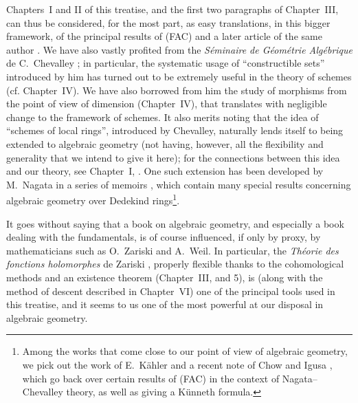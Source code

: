 Chapters~I and II of this treatise, and the first two paragraphs of Chapter~III,
can thus be considered, for the most part, as easy translations, in this bigger
framework, of the principal results of (FAC) and a later article of the same
author \cite{I-15}. We have also vastly profited from the {\it S\'eminaire de
G\'eom\'etrie Alg\'ebrique} de C.~Chevalley \cite{I-1}; in particular, the
systematic usage of ``constructible sets'' introduced by him has turned out to
be extremely useful in the theory of schemes (cf. Chapter~IV). We have also
borrowed from him the study of morphisms from
the point of view of dimension (Chapter~IV), that translates with negligible
change to the framework of schemes. It also merits noting that the idea of
``schemes of local rings'', introduced by Chevalley, naturally lends itself to
being extended to algebraic geometry (not having, however, all the flexibility
and generality that we intend to give it here); for the connections between this
idea and our theory, see Chapter~I, . One such extension has been
developed by M.~Nagata in a series of memoirs \cite{I-9}, which contain many
special results concerning algebraic geometry over Dedekind
rings\footnote{Among the works that come close to our point of view of
algebraic geometry, we pick out the work of E.~K\"ahler \cite{I-22} and a recent
note of Chow and Igusa \cite{I-3}, which go back over certain results of (FAC) in
the context of Nagata--Chevalley theory, as well as giving a K\"unneth
formula.}.

\sectionbreak

It goes without saying that a book on algebraic geometry, and especially a book
dealing with the fundamentals, is of course influenced, if only by proxy, by
mathematicians such as O.~Zariski and A.~Weil. In particular, the
{\it Th\'eorie des fonctions holomorphes} de Zariski \cite{I-20}, properly
flexible thanks to the cohomological methods and an existence theorem
(Chapter~III, \textsection{} and 5), is (along with the method of
descent described in Chapter~VI) one of the principal tools used in this
treatise, and it seems to us one of the most powerful at our disposal in
algebraic geometry.

